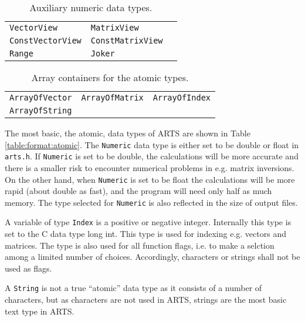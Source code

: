  \begin{table}[t]
  \begin{tabular}{p{4cm} p{4cm} p{4cm}}
   \verb|VectorView|         & \verb|MatrixView|         \\
   \verb|ConstVectorView|    & \verb|ConstMatrixView|    \\
   \verb|Range|              & \verb|Joker| \\
  \end{tabular}
  \caption{Auxiliary numeric data types.}
  \label{table:format:numaux}
 \end{table}

 \begin{table}[t]
  \begin{tabular}{p{4cm} p{4cm} p{4cm}}
   \verb|ArrayOfVector|  & \verb|ArrayOfMatrix|  & \verb|ArrayOfIndex|   \\
   \verb|ArrayOfString|  &                       &                        \\
  \end{tabular}
  \caption{Array containers for the atomic types.}
  \label{table:format:atomicarrays}
 \end{table}

\label{sec:formats:atomic}
 
The most basic, the atomic, data types of ARTS are shown in Table
\ref{table:format:atomic}. The \verb|Numeric| data type is either set
to be double or float in \verb|arts.h|. If \verb|Numeric| is set to be
double, the calculations will be more accurate and there is a smaller
risk to encounter numerical problems in e.g. matrix inversions.  On
the other hand, when \verb|Numeric| is set to be float the
calculations will be more rapid (about double as fast), and the
program will need only half as much memory. The type selected for
\verb|Numeric| is also reflected in the size of output files.

A variable of type \verb|Index| is a positive or negative integer.
Internally this type is set to the C data type long int.  This type is
used for indexing e.g. vectors and matrices. The type is also used for
all function flags, i.e. to make a selction among a limited number of
choices. Accordingly, characters or strings shall not be used as
flags.

A \verb|String| is not a true ``atomic'' data type as it consists of a
number of characters, but as characters are not used in ARTS, strings
are the most basic text type in ARTS.
  

\label{sec:formats:nummath}
 
